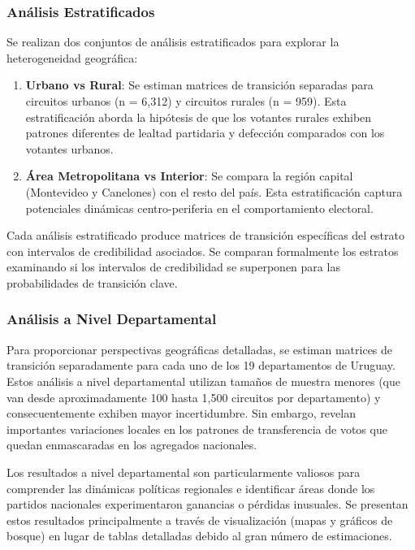 \subsubsection{Análisis Estratificados}

Se realizan dos conjuntos de análisis estratificados para explorar la heterogeneidad geográfica:

\begin{enumerate}
    \item \textbf{Urbano vs Rural}: Se estiman matrices de transición separadas para circuitos urbanos (n = 6,312) y circuitos rurales (n = 959). Esta estratificación aborda la hipótesis de que los votantes rurales exhiben patrones diferentes de lealtad partidaria y defección comparados con los votantes urbanos.

    \item \textbf{Área Metropolitana vs Interior}: Se compara la región capital (Montevideo y Canelones) con el resto del país. Esta estratificación captura potenciales dinámicas centro-periferia en el comportamiento electoral.
\end{enumerate}

Cada análisis estratificado produce matrices de transición específicas del estrato con intervalos de credibilidad asociados. Se comparan formalmente los estratos examinando si los intervalos de credibilidad se superponen para las probabilidades de transición clave.

\subsubsection{Análisis a Nivel Departamental}

Para proporcionar perspectivas geográficas detalladas, se estiman matrices de transición separadamente para cada uno de los 19 departamentos de Uruguay. Estos análisis a nivel departamental utilizan tamaños de muestra menores (que van desde aproximadamente 100 hasta 1,500 circuitos por departamento) y consecuentemente exhiben mayor incertidumbre. Sin embargo, revelan importantes variaciones locales en los patrones de transferencia de votos que quedan enmascaradas en los agregados nacionales.

Los resultados a nivel departamental son particularmente valiosos para comprender las dinámicas políticas regionales e identificar áreas donde los partidos nacionales experimentaron ganancias o pérdidas inusuales. Se presentan estos resultados principalmente a través de visualización (mapas y gráficos de bosque) en lugar de tablas detalladas debido al gran número de estimaciones.

